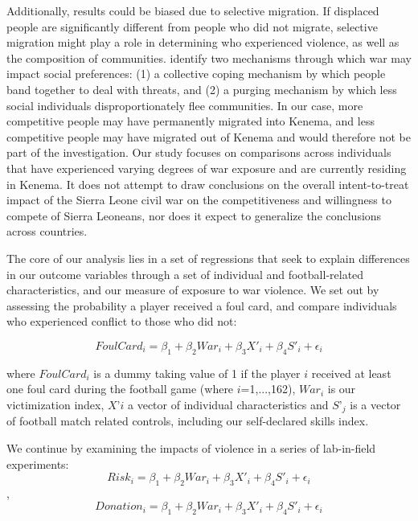 Additionally, results could be biased due to selective migration. If displaced people are significantly different from people who did not migrate, selective migration might play a role in determining who experienced violence, as well as the composition of communities. \citet{Gilligan2014} identify two mechanisms through which war may impact social preferences: (1) a collective coping mechanism by which people band together to deal with threats, and (2) a purging mechanism by which less social individuals disproportionately flee communities. In our case, more competitive people may have permanently migrated into Kenema, and less competitive people may have migrated out of Kenema and would therefore not be part of the investigation. Our study focuses on comparisons across individuals that have experienced varying degrees of war exposure and are currently residing in Kenema. It does not attempt to draw conclusions on the overall intent-to-treat impact of the Sierra Leone civil war on the competitiveness and willingness to compete of Sierra Leoneans, nor does it expect to generalize the conclusions across countries. 

The core of our analysis lies in a set of regressions that seek to explain differences in our outcome variables through a set of individual and football-related characteristics, and our measure of exposure to war violence. We set out by assessing the probability a player received a foul card, and compare individuals who experienced conflict to those who did not: 

\begin{equation}
\label{eq:slf:foul}
FoulCard_i = \beta_1 + \beta_2 War_i + \beta_3 X'_i + \beta_4 S'_i + \epsilon_i
\end{equation}

where $FoulCard_i$ is a dummy taking value of 1 if the player $i$ received at least one foul card during the football game (where $i$=1,...,162), $War_i$ is our victimization index, $X’i$ a vector of individual characteristics and $S’_j$ is a vector of football match related controls, including our self-declared skills index. 

We continue by examining the impacts of violence in a series of lab-in-field experiments:
\begin{equation}
\label{eq:slf:risk}
Risk_i = \beta_1 + \beta_2 War_i + \beta_3 X'_i + \beta_4 S'_i + \epsilon_i
\end{equation}
,
\begin{equation}
\label{eq:slf:donation}
Donation_i = \beta_1 + \beta_2 War_i + \beta_3 X'_i + \beta_4 S'_i + \epsilon_i
\end{equation}

